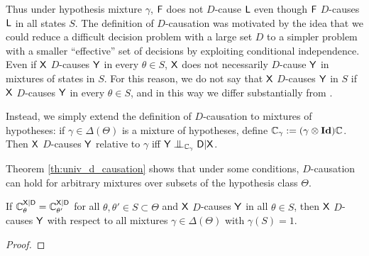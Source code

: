 Thus under hypothesis mixture $\gamma$, $\mathsf{F}$ does not $D$-cause $\mathsf{L}$ even though $\mathsf{F}$ $D$-causes $\mathsf{L}$ in all states $S$. The definition of $D$-causation was motivated by the idea that we could reduce a difficult decision problem with a large set $D$ to a simpler problem with a smaller ``effective'' set of decisions by exploiting conditional independence. Even if $\mathsf{X}$ $D$-causes $\mathsf{Y}$ in every $\theta\in S$, $\mathsf{X}$ does not necessarily $D$-cause $\mathsf{Y}$ in mixtures of states in $S$. For this reason, we do not say that $\mathsf{X}$ $D$-causes $\mathsf{Y}$ in $S$ if $\mathsf{X}$ $D$-causes $\mathsf{Y}$ in every $\theta\in S$, and in this way we differ substantially from \citet{heckerman_decision-theoretic_1995}.

Instead, we simply extend the definition of $D$-causation to mixtures of hypotheses: if $\gamma\in \Delta(\Theta)$ is a mixture of hypotheses, define $\mathbb{C}_\gamma:= (\gamma\otimes\textbf{Id})\mathbb{C}$. Then $\mathsf{X}$ $D$-causes $\mathsf{Y}$ relative to $\gamma$ iff $\RV{Y}\CI_{\kernel{C}_\gamma} \RV{D}|\RV{X}$.

Theorem \ref{th:univ_d_causation} shows that under some conditions, $D$-causation can hold for arbitrary mixtures over subsets of the hypothesis class $\Theta$.

\begin{theorem}\label{th:univ_d_causation}
If $\mathbb{C}^{\mathsf{X}|\mathsf{D}}_{\theta} = \mathbb{C}^{\mathsf{X}|\mathsf{D}}_{\theta'}$ for all $\theta,\theta'\in S\subset \Theta$ and $\mathsf{X}$ $D$-causes $\mathsf{Y}$ in all $\theta\in S$, then $\mathsf{X}$ $D$-causes $\mathsf{Y}$ with respect to all mixtures $\gamma\in \Delta(\Theta)$ with $\gamma(S)=1$.
\end{theorem}

\begin{proof}

\end{proof}